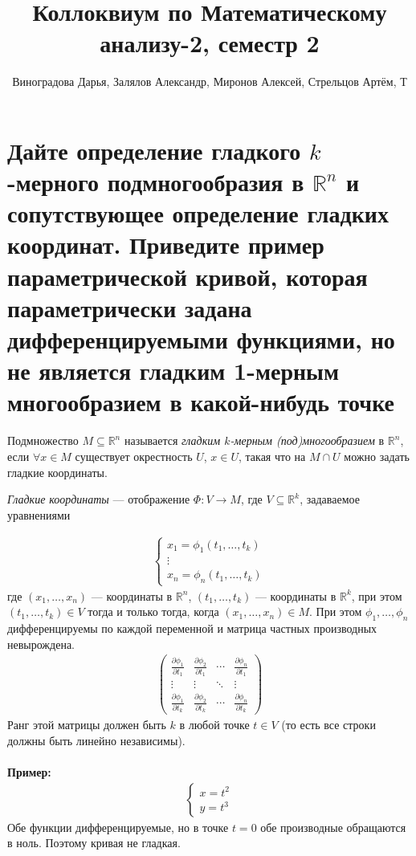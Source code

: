 \documentclass{article}
\title{Коллоквиум по Математическому анализу-2, семестр 2}
\author{Виноградова Дарья, Залялов Александр, Миронов Алексей, Стрельцов Артём, Т}
\date{}
\begin{document}
	\maketitle

	\tableofcontents

	\clearpage


	\setcounter{section}{13}

	\section{Дайте определение гладкого $k$-мерного подмногообразия в $\mathbb{R}^n$ и сопутствующее определение гладких координат. Приведите пример параметрической кривой, которая параметрически задана дифференцируемыми функциями, но не является гладким 1-мерным многообразием в какой-нибудь точке}
\begin{definition}
	Подмножество $M\subseteq \mathbb{R}^n$ называется \textit{гладким $k$-мерным (под)многообразием} в $\mathbb{R}^n$, если $\forall x \in M$ существует окрестность $U$, $x\in U$, такая что на $M \cap U$ можно задать гладкие координаты.
\end{definition}
\begin{definition}
\textit{Гладкие координаты} --- отображение $\Phi: V \xrightarrow{} M$, где $V \subseteq \mathbb{R}^k$, задаваемое уравнениями
\end{definition}
\begin{gather*}
\begin{cases}
    x_1 = \phi_1(t_1, \dotsc, t_k)\\
    \vdots\\
    x_n = \phi_n(t_1, \dotsc, t_k)
\end{cases}
\end{gather*}
где $(x_1, \dotsc, x_n)$ --- координаты в $\mathbb{R}^n$, $(t_1, \dotsc, t_k)$ --- координаты в $\mathbb{R}^k$,
при этом $(t_1, \dotsc, t_k) \in V$ тогда и только тогда, когда $(x_1, \dotsc, x_n)\in M$. При этом $\phi_1,\dotsc,\phi_n$ дифференцируемы по каждой переменной и матрица частных производных невырождена.
\begin{gather*}
\begin{pmatrix}
\frac{\partial \phi_1}{\partial t_1} & \frac{\partial \phi_2}{\partial t_1} & \cdots & \frac{\partial \phi_n}{\partial t_1} \\
\vdots & \vdots & \ddots & \vdots \\
\frac{\partial \phi_1}{\partial t_k} & \frac{\partial \phi_2}{\partial t_k} & \cdots & \frac{\partial \phi_n}{\partial t_k}
\end{pmatrix}
\end{gather*}
Ранг этой матрицы должен быть $k$ в любой точке $t \in V$ (то есть все строки должны быть линейно независимы).
\\\\
\textbf{Пример:}
\begin{gather*}
\begin{cases}
    x=t^2\\
    y=t^3
\end{cases}
\end{gather*}
Обе функции дифференцируемые, но в точке $t=0$ обе производные обращаются в ноль. Поэтому кривая не гладкая.
\end{document}
